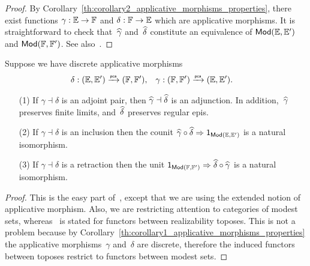 \begin{proof}
  By Corollary~\ref{th:corollary2_applicative_morphisms_properties},
  there exist functions $\gamma: {\mathbb{E}} \to {\mathbb{F}}$ and $\delta: {\mathbb{F}} \to
  {\mathbb{E}}$ which are applicative morphisms. It is straightforward to check
  that~$\widehat{\gamma}$ and~$\widehat{\delta}$ constitute an equivalence of
  $\mathsf{Mod}({\mathbb{E}}, {\mathbb{E}'})$ and $\mathsf{Mod}({\mathbb{F}}, {\mathbb{F}'})$. See also~\cite[Theorem
  2.5.6]{Longley:94}.
\end{proof}


\begin{theorem}
  \label{th:applicative_adjunction_functor_adjunction}%
  Suppose we have discrete applicative morphisms
  \begin{align*}
    \delta &: ({\mathbb{E}}, {\mathbb{E}'}) \xrightarrow{\scriptscriptstyle\mathsf{pca}}{} ({\mathbb{F}}, {\mathbb{F}'}),
    &
    \gamma &: ({\mathbb{F}}, {\mathbb{F}'}) \xrightarrow{\scriptscriptstyle\mathsf{pca}}{} ({\mathbb{E}}, {\mathbb{E}'}).
  \end{align*}
  \begin{enumerate}
  \item[(1)] If $\gamma \dashv \delta$ is an adjoint pair, then
    $\widehat{\gamma} \dashv \widehat{\delta}$ is an adjunction.
    In
    addition,~$\widehat{\gamma}$ preserves finite limits, and~$\widehat{\delta}$
    preserves regular epis.
  \item[(2)] If $\gamma \dashv \delta$ is an inclusion then the counit 
    $\widehat{\gamma} \circ \widehat{\delta} \Rightarrow \mathsf{1}_{\mathsf{Mod}({\mathbb{E}}, {\mathbb{E}'})}$ is 
    a natural isomorphism.
  \item[(3)] If $\gamma \dashv \delta$ is a retraction then the unit
    $\mathsf{1}_{\mathsf{Mod}({\mathbb{F}}, {\mathbb{F}'})} \Rightarrow \widehat{\delta} \circ \widehat{\gamma}$ is
    a natural isomorphism.
  \end{enumerate}
\end{theorem}

\begin{proof}
  This is the easy part of~\cite[Proposition 2.5.9]{Longley:94},
  except that we are using the extended notion of applicative
  morphism. Also, we are restricting attention to categories of modest
  sets, whereas~\cite[Proposition 2.5.9]{Longley:94} is stated for
  functors between realizability toposes. This is not a problem
  because by
  Corollary~\ref{th:corollary1_applicative_morphisms_properties} the
  applicative morphisms~$\gamma$ and~$\delta$ are discrete, therefore
  the induced functors between toposes restrict to functors between
  modest sets.
\end{proof}


